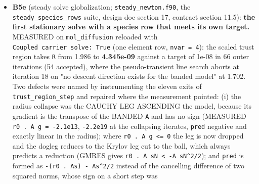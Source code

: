 \documentclass[english,a4paper]{my_memo}
\begin{document}
\begin{itemize}
  under-relaxation \texttt{omega} whenever \texttt{comp\_drift} failed to fall, but
  \texttt{comp\_drift} is the worse of the element drift and the carrier drift while
  \texttt{omega} damps the element relaxation alone (the carrier pass is bounded by
  \texttt{carrier\_trust}), so a carrier drift that failed to fall slowed the
  element alternation for nothing; the damping test now reads the element
  relaxation\textquotesingle s own drift (\texttt{elem\_drift}) and the exit test keeps the worst of
  the two. No regression case runs both \texttt{He\_diffusion} and the carrier
  transport, so the matrix cannot move. (iv) \texttt{f\_vib\_quench}/\texttt{e\_vib\_bound}
  staying at the entry composition inside the self-field loop is CLOSED BY
  MEASUREMENT (COST5): they are entry state through the operator-split
  field, and holding them at the first-pass value is worth 0.00 passes
  (6.96 against 6.96). Suites: \texttt{steady\_species\_rows} 74/0, \texttt{certification}
  29/0, \texttt{diffusion\_tests} 35/0.
\item
  \textbf{B5e} (steady solve globalization; \texttt{steady\_newton.f90}, the
  \texttt{steady\_species\_rows} suite, design doc section 17, contract section
  11.5): \textbf{the first stationary solve with a species row that meets its own
  target.} MEASURED on \texttt{mol\_diffusion} reloaded with \texttt{Coupled\ carrier\ solve:\ True} (one element row, \texttt{nvar\ =\ 4}): the scaled trust region takes \texttt{\textbar{}\textbar{}R\textbar{}\textbar{}}
  from 1.986 to \textbf{4.345e-09} against a target of 1e-08 in 66 outer
  iterations (54 accepted), where the pseudo-transient line search aborts at
  iteration 18 on "no descent direction exists for the banded model" at
  1.702. Two defects were named by instrumenting the eleven exits of
  \texttt{trust\_region\_step} and repaired where the measurement pointed: (i) the
  radius collapse was the CAUCHY LEG ASCENDING the model, because its
  gradient is the transpose of the BANDED \texttt{A} and has no sign (MEASURED
  \texttt{r0\ .\ A\ g\ =\ -2.1e13}, \texttt{-2.2e19} at the collapsing iterates, \texttt{pred}
  negative and exactly linear in the radius); where \texttt{r0\ .\ A\ g\ \textless{}=\ 0} the leg
  is now dropped and the dogleg reduces to the Krylov leg cut to the ball,
  which always predicts a reduction (GMRES gives \texttt{r0\ .\ A\ sN\ \textless{}\ -\textbar{}\textbar{}A\ sN\textbar{}\textbar{}\^{}2/2});
  and \texttt{pred} is formed as \texttt{-(r0\ .\ As)\ -\ \textbar{}\textbar{}As\textbar{}\textbar{}\^{}2/2} instead of the
  cancelling difference of two squared norms, whose sign on a short step was

\end{itemize}
\end{document}
